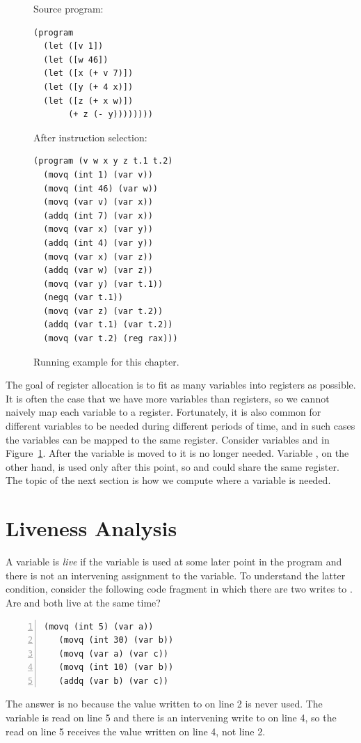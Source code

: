 \documentclass[11pt]{book}
\begin{document}
\begin{figure}
\begin{minipage}{0.45\textwidth}
Source program:
\begin{lstlisting}
(program
  (let ([v 1])
  (let ([w 46])
  (let ([x (+ v 7)])
  (let ([y (+ 4 x)])
  (let ([z (+ x w)])
       (+ z (- y))))))))
\end{lstlisting}
\end{minipage}
\begin{minipage}{0.45\textwidth}
After instruction selection:
\begin{lstlisting}
(program (v w x y z t.1 t.2)
  (movq (int 1) (var v))
  (movq (int 46) (var w))
  (movq (var v) (var x))
  (addq (int 7) (var x))
  (movq (var x) (var y))
  (addq (int 4) (var y))
  (movq (var x) (var z))
  (addq (var w) (var z))
  (movq (var y) (var t.1))
  (negq (var t.1))
  (movq (var z) (var t.2))
  (addq (var t.1) (var t.2))
  (movq (var t.2) (reg rax)))
\end{lstlisting}
\end{minipage}
\caption{Running example for this chapter.}
\label{fig:reg-eg}
\end{figure}

The goal of register allocation is to fit as many variables into
registers as possible. It is often the case that we have more
variables than registers, so we cannot naively map each variable to a
register. Fortunately, it is also common for different variables to be
needed during different periods of time, and in such cases the
variables can be mapped to the same register.  Consider variables
 and  in Figure~\ref{fig:reg-eg}.  After the variable
 is moved to  it is no longer needed.  Variable
, on the other hand, is used only after this point, so
 and  could share the same register. The topic of the
next section is how we compute where a variable is needed.


\section{Liveness Analysis}
\label{sec:liveness-analysis}

A variable is \emph{live} if the variable is used at some later point
in the program and there is not an intervening assignment to the
variable.
%
To understand the latter condition, consider the following code
fragment in which there are two writes to . Are  and
 both live at the same time?
\begin{lstlisting}[numbers=left,numberstyle=\tiny]
   (movq (int 5) (var a))
   (movq (int 30) (var b))
   (movq (var a) (var c))
   (movq (int 10) (var b))
   (addq (var b) (var c))
\end{lstlisting}
The answer is no because the value  written to  on
line 2 is never used. The variable  is read on line 5 and
there is an intervening write to  on line 4, so the read on
line 5 receives the value written on line 4, not line 2.
\end{document}
